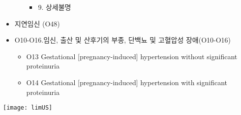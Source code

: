 \begin{itemize}
\begin{itemize}[-]
\begin{itemize}[-]
		\item 9. 상세불명
		\end{itemize}
	\end{itemize}	
\item 지연임신 (O48) 
\item O10-O16.임신, 출산 및 산후기의 부종, 단백뇨 및 고혈압성 장애(O10-O16)
	\begin{itemize}[-]\tightlist
	\item O13 Gestational [pregnancy-induced] hypertension without significant proteinuria
	\item O14 Gestational [pregnancy-induced] hypertension with significant proteinuria
	\end{itemize}
\end{itemize}
\prezi{\clearpage}
\par
\texttt{[image: limUS]}
\prezi{\clearpage}
